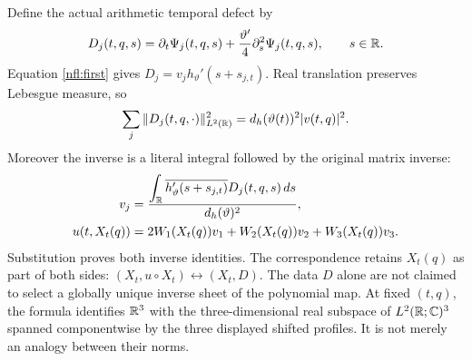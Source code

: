Define the actual arithmetic temporal defect by
\begin{equation}
 D_j(t,q,s)=\partial_t\Psi_j(t,q,s)
                   +\frac{\vartheta'}4\partial_s^2\Psi_j(t,q,s),
 \qquad s\in\mathbb R.
 \label{nfl:defect}
\end{equation}
Equation \eqref{nfl:first} gives $D_j=v_j h_{\vartheta}'(s+s_{j,t})$.
Real translation preserves Lebesgue measure, so
\begin{equation}
 \sum_j\|D_j(t,q,\cdot)\|_{L^2(\mathbb R)}^2
       =d_h(\vartheta(t))^2|v(t,q)|^2.
 \label{nfl:norm}
\end{equation}
Moreover the inverse is a literal integral followed by the original
matrix inverse:
\begin{equation}
 \begin{aligned}
 v_j&=\frac{\displaystyle\int_\mathbb R
      \overline{h_{\vartheta}'(s+s_{j,t})}D_j(t,q,s)\,ds}
                {d_h(\vartheta)^2},\\
 u(t,X_t(q))&=2W_1(X_t(q))v_1+W_2(X_t(q))v_2+W_3(X_t(q))v_3.
 \end{aligned}
 \label{nfl:recoveru}
\end{equation}
Substitution proves both inverse identities. The correspondence retains
$X_t(q)$ as part of both sides:
$(X_t,u\circ X_t)\leftrightarrow(X_t,D)$. The data $D$ alone are not
claimed to select a globally unique inverse sheet of the polynomial map.
At fixed $(t,q)$, the formula
identifies $\mathbb R^3$ with the three-dimensional real subspace of
$L^2(\mathbb R;\mathbb C)^3$ spanned componentwise by the three displayed shifted
profiles. It is not merely an analogy between their norms.

